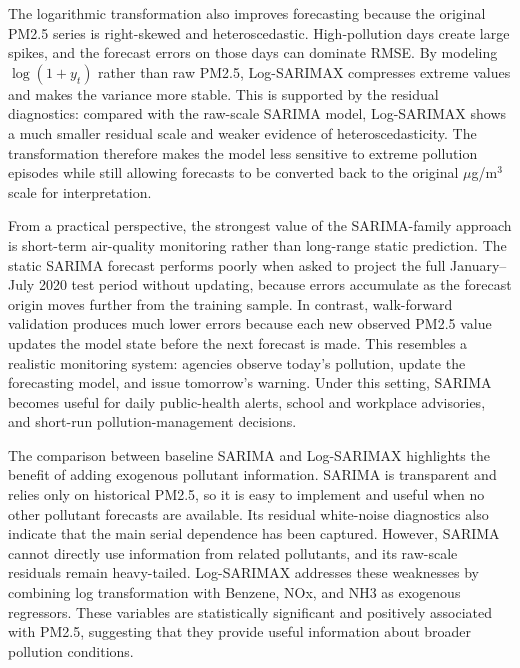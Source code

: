\documentclass[11pt]{article}
\begin{document}
The logarithmic transformation also improves forecasting because the original PM2.5 series is right-skewed and heteroscedastic. High-pollution days create large spikes, and the forecast errors on those days can dominate RMSE. By modeling \(\log(1+y_t)\) rather than raw PM2.5, Log-SARIMAX compresses extreme values and makes the variance more stable. This is supported by the residual diagnostics: compared with the raw-scale SARIMA model, Log-SARIMAX shows a much smaller residual scale and weaker evidence of heteroscedasticity. The transformation therefore makes the model less sensitive to extreme pollution episodes while still allowing forecasts to be converted back to the original \(\mu\)g/m\(^3\) scale for interpretation.

From a practical perspective, the strongest value of the SARIMA-family approach is short-term air-quality monitoring rather than long-range static prediction. The static SARIMA forecast performs poorly when asked to project the full January--July 2020 test period without updating, because errors accumulate as the forecast origin moves further from the training sample. In contrast, walk-forward validation produces much lower errors because each new observed PM2.5 value updates the model state before the next forecast is made. This resembles a realistic monitoring system: agencies observe today's pollution, update the forecasting model, and issue tomorrow's warning. Under this setting, SARIMA becomes useful for daily public-health alerts, school and workplace advisories, and short-run pollution-management decisions.

The comparison between baseline SARIMA and Log-SARIMAX highlights the benefit of adding exogenous pollutant information. SARIMA is transparent and relies only on historical PM2.5, so it is easy to implement and useful when no other pollutant forecasts are available. Its residual white-noise diagnostics also indicate that the main serial dependence has been captured. However, SARIMA cannot directly use information from related pollutants, and its raw-scale residuals remain heavy-tailed. Log-SARIMAX addresses these weaknesses by combining log transformation with Benzene, NOx, and NH3 as exogenous regressors. These variables are statistically significant and positively associated with PM2.5, suggesting that they provide useful information about broader pollution conditions.
\end{document}
